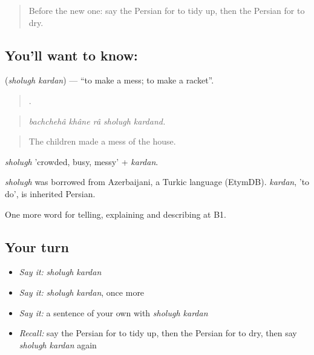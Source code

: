 \label{lesson:FA-C536-sholugh-kardan}



\begin{quote}
Before the new one: say the Persian for to tidy up, then the Persian for to dry.
\end{quote}

\subsection*{You'll want to know:  }
\textbf{ } (\emph{sholugh kardan}) — \textquotedblleft{}to make a mess; to make a racket\textquotedblright{}.

\begin{quote}
     .
\end{quote}

\begin{quote}
\emph{bachchehâ khâne râ sholugh kardand.}
\end{quote}

\begin{quote}
The children made a mess of the house.
\end{quote}

\emph{sholugh} 'crowded, busy, messy' + \emph{kardan}.

\begin{cousinweb}
\emph{sholugh} was borrowed from Azerbaijani, a Turkic language (EtymDB). \emph{kardan}, 'to do', is inherited Persian.
\end{cousinweb}

\begin{grammarlens}[title={What you've built}]
One more word for telling, explaining and describing at B1.
\end{grammarlens}

\subsection*{Your turn}
\begin{itemize}
\raggedright
  \item \emph{Say it:} \emph{sholugh kardan}
  \item \emph{Say it:} \emph{sholugh kardan}, once more
  \item \emph{Say it:} a sentence of your own with \emph{sholugh kardan}
  \item \emph{Recall:} say the Persian for to tidy up, then the Persian for to dry, then say \emph{sholugh kardan} again
\end{itemize}

